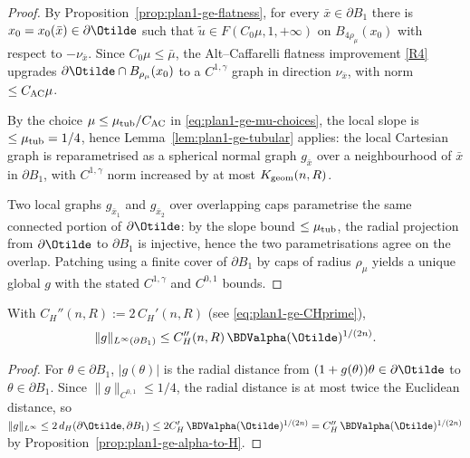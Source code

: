 \begin{proof}
By Proposition~\ref{prop:plan1-ge-flatness}, for every
\(\bar x\in\partial B_1\) there is \(x_0=x_0(\bar x)\in\partial\Otilde\)
such that \(\widetilde u\in F(C_0\mu,1,+\infty)\) on
\(B_{4\rho_\mu}(x_0)\) with respect to \(-\nu_{\bar x}\). Since
\(C_0\mu\le\bar\mu\), the Alt--Caffarelli flatness improvement \ref{R4}
upgrades \(\partial\Otilde\cap B_{\rho_\mu}(x_0)\) to a \(C^{1,\gamma}\)
graph in direction \(\nu_{\bar x}\), with norm \(\le C_{\rm AC}\mu\).

By the choice \(\mu\le\mu_{\rm tub}/C_{\rm AC}\) in
\eqref{eq:plan1-ge-mu-choices}, the local slope is \(\le\mu_{\rm tub}=1/4\),
hence Lemma~\ref{lem:plan1-ge-tubular} applies: the local Cartesian graph
is reparametrised as a spherical normal graph \(g_{\bar x}\) over a
neighbourhood of \(\bar x\) in \(\partial B_1\), with \(C^{1,\gamma}\)
norm increased by at most \(K_{\rm geom}(n,R)\).

Two local graphs \(g_{\bar x_1}\) and \(g_{\bar x_2}\) over overlapping
caps parametrise the same connected portion of \(\partial\Otilde\): by
the slope bound \(\le\mu_{\rm tub}\), the radial projection from
\(\partial\Otilde\) to \(\partial B_1\) is injective, hence the two
parametrisations agree on the overlap. Patching using a finite cover of
\(\partial B_1\) by caps of radius \(\rho_\mu\) yields a unique global
\(g\) with the stated \(C^{1,\gamma}\) and \(C^{0,1}\) bounds.
\end{proof}

\begin{lemma}
\label{lem:plan1-ge-Linfty}
With \(C_H''(n,R):=2\,C_H'(n,R)\) (see \eqref{eq:plan1-ge-CHprime}),
\begin{equation}\label{eq:plan1-ge-Linfty}
   \|g\|_{L^\infty(\partial B_1)}
   \le C_H''(n,R)\,\BDValpha(\Otilde)^{1/(2n)}.
\end{equation}
\end{lemma}

\begin{proof}
For \(\theta\in\partial B_1\), \(|g(\theta)|\) is the radial distance
from \((1+g(\theta))\theta\in\partial\Otilde\) to \(\theta\in\partial B_1\).
Since \(\|g\|_{C^{0,1}}\le 1/4\), the radial distance is at most twice
the Euclidean distance, so
\(\|g\|_{L^\infty}\le 2\,d_H(\partial\Otilde,\partial B_1)
\le 2C_H'\,\BDValpha(\Otilde)^{1/(2n)}=C_H''\,\BDValpha(\Otilde)^{1/(2n)}\)
by Proposition~\ref{prop:plan1-ge-alpha-to-H}.
\end{proof}

